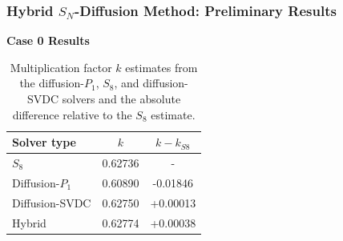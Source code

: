 \begin{frame}
  \frametitle{Hybrid $S_N$-Diffusion Method: Preliminary Results}
  \textbf{Case 0 Results}
  \begin{table}
    \centering
    \caption{Multiplication factor $k$ estimates from the diffusion-$P_1$, $S_8$, and
    diffusion-\gls{SVDC} solvers and the absolute difference relative to the $S_8$ estimate.}
    \begin{tabular}{l S S}
      \toprule
      Solver type & {$k$} & {$k-k_{S8}$} \\
      \midrule
      $S_8$ & 0.62736 & {-} \\
      Diffusion-$P_1$ & 0.60890 & -0.01846 \\
      Diffusion-\gls{SVDC} & 0.62750 & +0.00013 \\
      Hybrid & 0.62774 & +0.00038 \\
      \bottomrule
    \end{tabular}
    \label{table:c0k}
  \end{table}
\end{frame}

